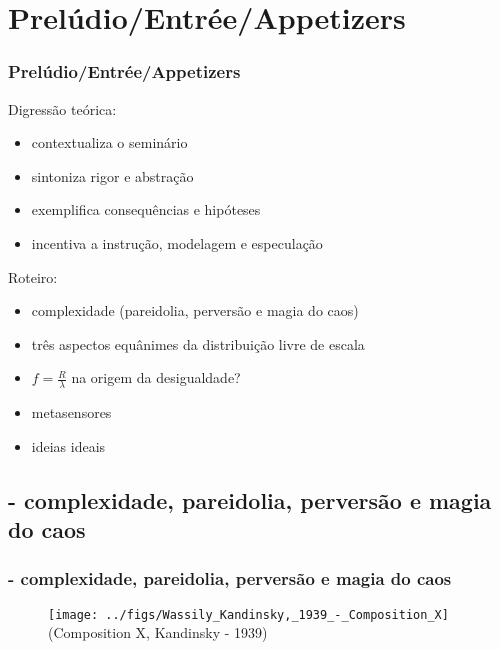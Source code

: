 \documentclass[10pt]{beamer}
\begin{document}
\section{Prelúdio/Entrée/Appetizers}
\begin{frame}
\frametitle{Prelúdio/Entrée/Appetizers}


Digressão teórica:
\begin{itemize}
	\item contextualiza o seminário
	\item sintoniza rigor e abstração
	\item exemplifica consequências e hipóteses
	\item incentiva a instrução, modelagem e especulação
\end{itemize}

\vspace{.7cm}

Roteiro:
\begin{itemize}
	\item complexidade (pareidolia, perversão e magia do caos)
	\item três aspectos equânimes da distribuição livre de escala
	\item $f=\frac{R}{\lambda}$ na origem da desigualdade?
	\item metasensores
	\item ideias ideais
\end{itemize}
\end{frame}

\subsection{- complexidade, pareidolia, perversão e magia do caos}
\begin{frame}
\frametitle{- complexidade, pareidolia, perversão e magia do caos}
\begin{figure}[!h]
    \texttt{[image: ../figs/Wassily\_Kandinsky,\_1939\_-\_Composition\_X]}\\
    (Composition X, Kandinsky - 1939)
        \label{fig:mesam}
\end{figure}
\end{frame}
\end{document}
